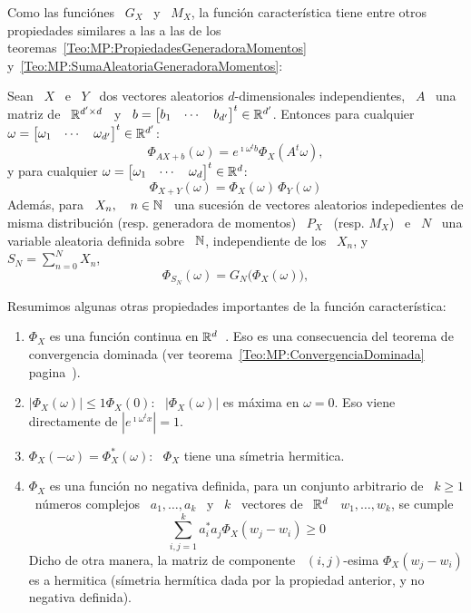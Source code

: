 Como las  funci\'ones \ $G_X$ \  y \ $M_X$, la  funci\'on caracter\'istica tiene
entre    otros    propiedades    similares     a    las    a    las    de    los
teoremas~\ref{Teo:MP:PropiedadesGeneradoraMomentos}
y~\ref{Teo:MP:SumaAleatoriaGeneradoraMomentos}:
%
\begin{teorema}%
\label{Teo:MP:PropiedadesFuncionCaracteristica}
%
  Sean  \   $X$  \  e  \   $Y$  \  dos   vectores  aleatorios  $d$-dimensionales
  independientes,  \ $A$  \ una  matriz de  \  $\mathbb{R}^{d' \times  d}$ \  y \  $b
  =  \begin{bmatrix} b_1  &  \cdots &  b_{d'}  \end{bmatrix}^t \in  \mathbb{R}^{d'}$.
  Entonces  para  cualquier  $\omega  =  \begin{bmatrix}  \omega_1  &  \cdots  &
    \omega_{d'} \end{bmatrix}^t \in \mathbb{R}^{d'}$:
  \[
  \Phi_{A X + b}(\omega) =  e^{\imath \omega^t b} \Phi_X\left( A^t \omega \right),
  \]
  y   para   cualquier  $\omega   =   \begin{bmatrix}   \omega_1   &  \cdots   &
    \omega_d \end{bmatrix}^t \in \mathbb{R}^d$:
  \[
  \Phi_{X+Y}(\omega) = \Phi_X(\omega) \, \Phi_Y(\omega)
  \]
  Adem\'as,  para \  $X_n, \quad  n  \in \mathbb{N}$  \, una  sucesi\'on de  vectores
  aleatorios  indepedientes  de   misma  distribuci\'on  (resp.   generadora  de
  momentos) \ $P_X$ \ (resp. $M_X$) \  e \ $N$ \ una variable aleatoria definida
  sobre \ $\mathbb{N}$, independiente de los \ $X_n$, y \ $ S_N = \sum_{n=0}^N X_n$,
  \[
  \Phi_{S_N}(\omega) =  G_N \big( \Phi_X(\omega) \big),
  \]
\end{teorema}

Resumimos algunas otras propiedades importantes de la funci\'on caracter\'istica:
%
\begin{enumerate}
\item\label{Prop:MP:ContinuidadPhiX}  $\Phi_X$  es  una  funci\'on  continua  en
  $\mathbb{R}^d$~\cite[Prop.~5.2.1]{Pin09}.  Eso es una  consecuencia del  teorema de
  convergencia     dominada     (ver    teorema~\ref{Teo:MP:ConvergenciaDominada}
  pagina~\pageref{Teo:MP:ConvergenciaDominada}).
%
\item\label{Prop:MP:MaximoPhiX} $\left| \Phi_X(\omega) \right| \le 1 \Phi_X(0)$:
  \  $\left| \Phi_X(\omega)  \right|$ es  m\'axima en  $\omega =  0$.  Eso viene
  directamente de $\left| e^{\imath \omega^t x} \right| = 1$.
%
\item\label{Prop:MP:HermiticaPhiX}   $\Phi_X(-\omega)  =   \Phi_X^*(\omega)$:  \
  $\Phi_X$ tiene una s\'imetria hermitica.
%
\item  $\Phi_X$ es  una funci\'on  no negativa  definida, \ie  para  un conjunto
  arbitrario de \ $k  \ge 1$ \ n\'umeros complejos \ $a_1 , \ldots  , a_k$ \ y \
  $k$ \ vectores de \ $\mathbb{R}^d$ \ $w_1 , \ldots , w_k$, se cumple
  \[
  \sum_{i,j=1}^k a_i^* a_j \Phi_X(w_j-w_i) \ge 0
  \]
  Dicho   de   otra   manera,   la   matriz  de   componente   \   $(i,j)$-esima
  $\Phi_X(w_j-w_i)$ es a hermitica (s\'imetria herm\'itica dada por la propiedad
  anterior, y no negativa definida).
%
\end{enumerate}

